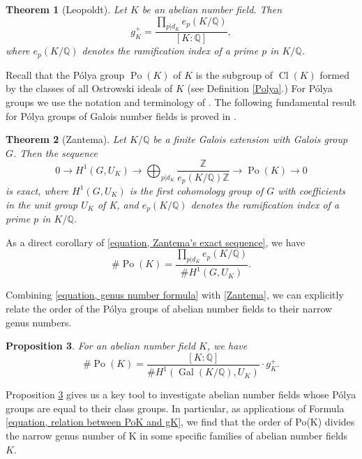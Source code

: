 \documentclass[12pt]{amsart}
\newtheorem{theorem}{Theorem}[section]
\newtheorem{proposition}[theorem]{Proposition}
\theoremstyle{definition}
\numberwithin{equation}{section}
\DeclareMathOperator{\Po}{Po}
\DeclareMathOperator{\Cl}{Cl}
\DeclareMathOperator{\Gal}{Gal}
\begin{document}
\begin{theorem} [{Leopoldt}] \label{theorem, Leopoldt's result for the genus number}
	Let $K$ be an abelian number field. Then
	\begin{equation} \label{equation, genus number formula}
		g_K^{+}=\frac{\prod_{p|d_K} e_{p}(K/\mathbb{Q})}{[K:\mathbb{Q}]},
	\end{equation}
	where $e_{p}(K/\mathbb{Q})$ denotes the ramification index of a prime $p$ in $K/\mathbb{Q}$. 
\end{theorem}


Recall that the P\'olya group $\Po(K)$ of $K$ is the subgroup of $\Cl(K)$ formed by the classes of all Ostrowski ideals of $K$ (see Definition \ref{Polya}.)  For P\'{o}lya groups we use the notation and terminology of \cite[Chapter II, $\S$3]{Cahen-Chabert's book}. The following fundamental result for P\'{o}lya groups of Galois number fields is proved in 
\cite[ Section 3]{Zantema}.
\begin{theorem}[{Zantema}]  \label{theorem, Zantema's exact sequence}
Let $K/\mathbb{Q}$ be a finite Galois extension with Galois group $G$. Then the  sequence 
	\begin{equation} \label{equation, Zantema's exact sequence}
		0 \longrightarrow H^1(G,U_K) \longrightarrow \bigoplus _{p | d_K} \frac{\mathbb{Z}}{e_{p} (K/\mathbb{Q}) \mathbb{Z}}   \longrightarrow \Po(K) \longrightarrow 0
	\end{equation}
	is exact, where $H^1(G,U_K)$ is the first cohomology group of $G$ with coefficients in the unit group $U_K$ of K, and $e_{p}(K/\mathbb{Q})$ denotes the ramification index of a prime $p$ in $K/\mathbb{Q}$.
\end{theorem}
As a direct corollary of \eqref{equation, Zantema's exact sequence}, we have
\begin{equation}
\label{Zantema}
\#\Po(K)=\frac{\prod_{p|d_K} e_{p}(K/\mathbb{Q})}{\# H^1(G,U_K) }.
\end{equation}

Combining \eqref{equation, genus number formula} with  \eqref{Zantema}, we can explicitly relate the order of the P\'olya groups of abelian number fields to their narrow genus numbers.  

\begin{proposition} \label{proposition, relation between PoK and gK}
	For an abelian number field $K$, we have
	\begin{equation} \label{equation, relation between PoK and gK}
		\#\Po(K)=\frac{[K:\mathbb{Q}]}{\# H^1(\Gal(K/\mathbb{Q}),U_K)}\cdot g_K^{+}.
	\end{equation}
\end{proposition}
Proposition \ref{proposition, relation between PoK and gK} gives us a key tool to investigate abelian number fields whose P\'olya groups are equal to their class groups. In particular, as applications of Formula \eqref{equation, relation between PoK and gK}, we find that the order of Po(K) divides the narrow genus number of K in some specific families of abelian number fields $K$. 
\end{document}
